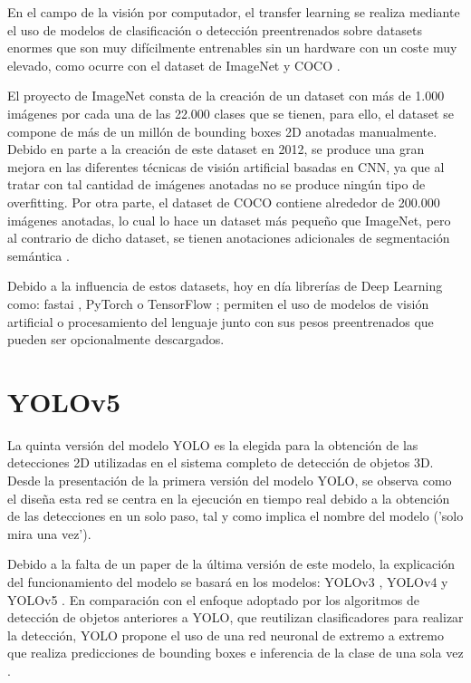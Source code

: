 En el campo de la visión por computador, el transfer learning se realiza mediante el uso de modelos de clasificación o detección preentrenados sobre datasets enormes que son muy difícilmente entrenables sin un hardware con un coste muy elevado, como ocurre con el dataset de ImageNet \cite{ImageNet_dataset} y COCO \cite{COCO_dataset}.

El proyecto de ImageNet consta de la creación de un dataset con más de 1.000 imágenes por cada una de las 22.000 clases que se tienen, para ello, el dataset se compone de más de un millón de bounding boxes 2D anotadas manualmente. Debido en parte a la creación de este dataset en 2012, se produce una gran mejora en las diferentes técnicas de visión artificial basadas en \ac{CNN}, ya que al tratar con tal cantidad de imágenes anotadas no se produce ningún tipo de overfitting. Por otra parte, el dataset de COCO contiene alrededor de 200.000 imágenes anotadas, lo cual lo hace un dataset más pequeño que ImageNet, pero al contrario de dicho dataset, se tienen anotaciones adicionales de segmentación semántica \cite{top_img_datasets}.

Debido a la influencia de estos datasets, hoy en día librerías de Deep Learning como: fastai \cite{fastai}, PyTorch \cite{Pytorch} o TensorFlow \cite{Tensorflow}; permiten el uso de modelos de visión artificial o procesamiento del lenguaje junto con sus pesos preentrenados que pueden ser opcionalmente descargados.

\section{YOLOv5}
\label{sec:YOLOv5}

La quinta versión del modelo \ac{YOLO} es la elegida para la obtención de las detecciones 2D utilizadas en el sistema completo de detección de objetos 3D. Desde la presentación de la primera versión del modelo \ac{YOLO}, se observa como el diseña esta red se centra en la ejecución en tiempo real debido a la obtención de las detecciones en un solo paso, tal y como implica el nombre del modelo ('solo mira una vez').

Debido a la falta de un paper de la última versión de este modelo, la explicación del funcionamiento del modelo se basará en los modelos: YOLOv3 \cite{YOLOv3}, YOLOv4 \cite{YOLOv4} y YOLOv5 \cite{YOLOv5}. En comparación con el enfoque adoptado por los algoritmos de detección de objetos anteriores a \ac{YOLO}, que reutilizan clasificadores para realizar la detección, \ac{YOLO} propone el uso de una red neuronal de extremo a extremo que realiza predicciones de bounding boxes e inferencia de la clase de una sola vez \cite{yolo_comparison}.

